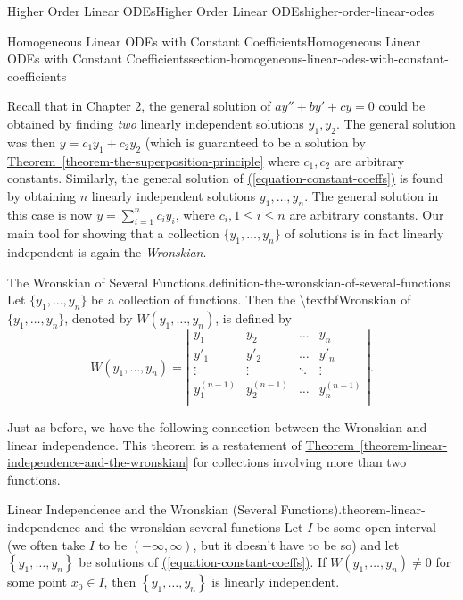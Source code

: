 \documentclass[oneside,10pt,]{book}
\numberwithin{equation}{section}
\newcommand{\set}[1]{\left\{ #1 \right\}}
\newcommand{\amp}{&}
\begin{document}
\begin{chapterptx}{Higher Order Linear ODEs}{}{Higher Order Linear ODEs}{}{}{higher-order-linear-odes}
\begin{sectionptx}{Homogeneous Linear ODEs with Constant Coefficients}{}{Homogeneous Linear ODEs with Constant Coefficients}{}{}{section-homogeneous-linear-odes-with-constant-coefficients}
\par
\hypertarget{p-261}{}%
Recall that in Chapter 2, the general solution of \(ay''+by'+cy=0\) could be obtained by finding \emph{two} linearly independent solutions \(y_{1},y_{2}\). The general solution was then \(y = c_{1}y_{1}+c_{2}y_{2}\) (which is guaranteed to be a solution by \hyperref[theorem-the-superposition-principle]{Theorem~\ref{theorem-the-superposition-principle}} where \(c_{1},c_{2}\) are arbitrary constants. Similarly, the general solution of \hyperref[equation-constant-coeffs]{(\ref{equation-constant-coeffs})} is found by obtaining \(n\) linearly independent solutions \(y_{1},\dots,y_{n}\). The general solution in this case is now \(y = \sum_{i=1}^{n}c_{i}y_{i}\), where \(c_{i},1\leq i\leq n\) are arbitrary constants. Our main tool for showing that a collection \(\{y_{1},\dots,y_{n}\}\) of solutions is in fact linearly independent is again the \emph{Wronskian}.%
\begin{definition}{The Wronskian of Several Functions.}{definition-the-wronskian-of-several-functions}%
 Let \(\{y_{1},\dots,y_{n}\}\) be a collection of functions. Then the \textbackslash{}textbf\textbraceleft{}Wronskian\textbraceright{} of \(\{y_{1},\dots,y_{n}\}\), denoted by \(W(y_{1},\dots,y_{n})\), is defined by%
\begin{equation*}
W(y_{1},\dots,y_{n}) = \left|\begin{array}{cccc}
y_{1} \amp y_{2} \amp \dots   \amp y_{n}   \\
y'_{1}  \amp y'_{2}  \amp \dots   \amp y'_{n}  \\
\vdots  \amp \vdots  \amp \ddots  \amp \vdots  \\
y^{(n-1)}_{1} \amp y^{(n-1)}_{2} \amp \dots   \amp y^{(n-1)}_{n} \\
\end{array}\right|.
\end{equation*}
\end{definition}
\hypertarget{p-262}{}%
Just as before, we have the following connection between the Wronskian and linear independence. This theorem is a restatement of \hyperref[theorem-linear-independence-and-the-wronskian]{Theorem~\ref{theorem-linear-independence-and-the-wronskian}} for collections involving more than two functions.%
\begin{theorem}{Linear Independence and the Wronskian (Several Functions).}{}{theorem-linear-independence-and-the-wronskian-several-functions}%
\hypertarget{p-263}{}%
Let \(I\) be some open interval (we often take \(I\) to be \((-\infty,\infty)\), but it doesn't have to be so) and let \(\set{y_{1},\dots,y_{n}}\) be solutions of \hyperref[equation-constant-coeffs]{(\ref{equation-constant-coeffs})}. If \(W(y_{1},\dots,y_{n})\neq0\) for some point \(x_{0}\in I\), then \(\set{y_{1},\dots,y_{n}}\) is linearly independent.%

\end{theorem}
\end{sectionptx}
\end{chapterptx}
\end{document}
